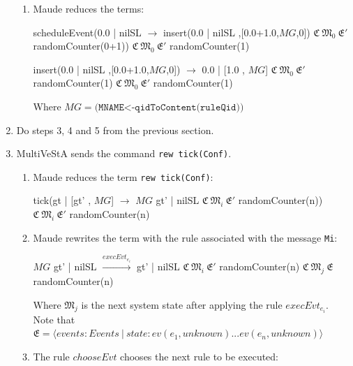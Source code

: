 \begin{enumerate}
\begin{enumerate}
        \item Maude reduces the terms:
        \begin{maude}
                                
scheduleEvent({0.0 | nilSL } $\rightarrow$ insert({0.0 | nilSL },[0.0+1.0,$MG$,0])
{$\mathfrak{C} \ \mathfrak{M}_{0} \ \mathfrak{E'}$ randomCounter(0+1)})   {$\mathfrak{C} \ \mathfrak{M}_{0} \ \mathfrak{E'}$ randomCounter(1)}\end{maude}

        \begin{maude}
                                    
insert({0.0 | nilSL },[0.0+1.0,$MG$,0]) $   \rightarrow$ {0.0 | [1.0 , $MG$] }
{$\mathfrak{C} \ \mathfrak{M}_{0} \ \mathfrak{E'}$ randomCounter(1)}                {$\mathfrak{C} \ \mathfrak{M}_{0} \ \mathfrak{E'}$ randomCounter(1)}\end{maude}

Where $MG = \texttt{(MNAME<-qidToContent(ruleQid))}$
    \end{enumerate}

\item Do steps 3, 4 and 5 from the previous section.

\item MultiVeStA sends the command \texttt{rew tick(Conf)}.
    \begin{enumerate}
        \item Maude reduces the term \texttt{rew tick(Conf)}:
        \begin{maude}

tick({gt | [gt' , $MG$]}     $\rightarrow$  $MG$ {gt' | nilSL }
{$\mathfrak{C} \ \mathfrak{M}_{i} \ \mathfrak{E'}$ randomCounter(n)})     {$\mathfrak{C} \ \mathfrak{M}_{i} \ \mathfrak{E'}$ randomCounter(n)}\end{maude}
        \item Maude rewrites the term with the rule associated with the message \texttt{Mi}:
        \begin{maude}
        
$MG$ {gt' | nilSL }    $\xrightarrow{execEvt_{e_i}}$ {gt' | nilSL }
{$\mathfrak{C} \ \mathfrak{M}_{i} \ \mathfrak{E'}$ randomCounter(n)}     {$\mathfrak{C} \ \mathfrak{M}_{j} \ \mathfrak{E}$  randomCounter(n)}\end{maude}
        
        Where $\mathfrak{M}_{j}$ is the next system state after applying the rule $execEvt_{e_i}$. Note that $\mathfrak{E} = \langle events : Events \ | \ state: ev(e_1,unknown) ... ev(e_n, unknown) \rangle$
        \item The rule $chooseEvt$ chooses the next rule to be executed:
        \begin{maude} 


\end{maude}
\end{enumerate}
\end{enumerate}
